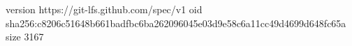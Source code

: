 version https://git-lfs.github.com/spec/v1
oid sha256:c8206c51648b661badfbc6ba262096045e03d9e58c6a11cc49d4699d648fc65a
size 3167
